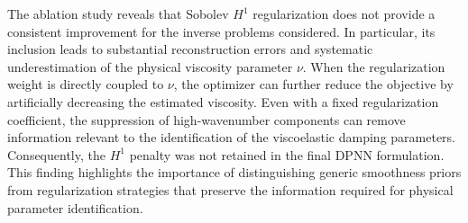 \documentclass{Configuration_Files/PoliMi3i_thesis}
\newif\ifshowthesischanges
\DeclareRobustCommand{\thesischange}[2]{%
    \ifshowthesischanges
        \textcolor{#1}{#2}%
    \else
        #2%
    \fi
}
\def\thesischange#1#2{#2}%
\begin{document}
\begin{table}[H]
\centering
\small
\caption{\thesischange{red}{Ablation study on regularization components for PSTD-DPNN across Gaussian and Triangular initial profiles. Comparing the proposed unregularized data fitting formulation against spatial sparsity ($L_1$), Sobolev smoothness ($H^1$), and coupled versus decoupled viscosity weighting.}}
\label{tab:dpnn_ablation}
\end{table}

\thesischange{red}{The ablation study reveals that Sobolev $H^1$ regularization does not provide a consistent improvement for the inverse problems considered. In particular, its inclusion leads to substantial reconstruction errors and systematic underestimation of the physical viscosity parameter $\nu$. When the regularization weight is directly coupled to $\nu$, the optimizer can further reduce the objective by artificially decreasing the estimated viscosity. Even with a fixed regularization coefficient, the suppression of high-wavenumber components can remove information relevant to the identification of the viscoelastic damping parameters. Consequently, the $H^1$ penalty was not retained in the final DPNN formulation. This finding highlights the importance of distinguishing generic smoothness priors from regularization strategies that preserve the information required for physical parameter identification.}
\end{document}
